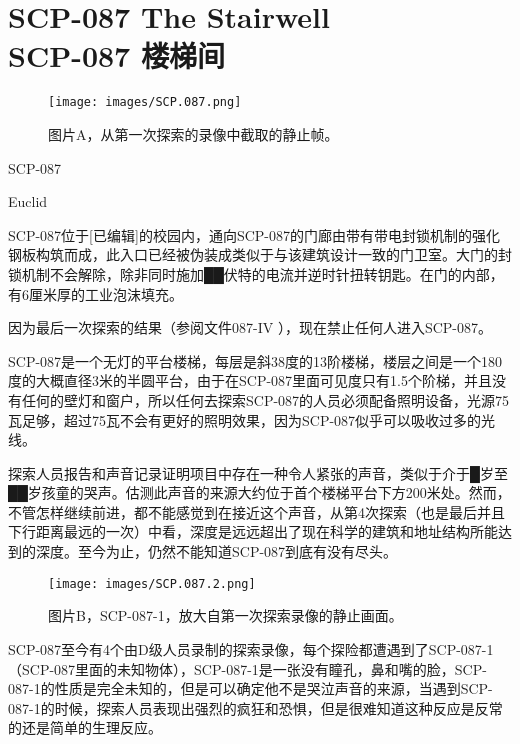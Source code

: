 \chapter[SCP-087 楼梯间]{
    SCP-087 The Stairwell\\
    SCP-087 楼梯间\\
    \heritage
}

\label{chap:SCP-087}

\begin{figure}[H]
    \centering
    \texttt{[image: images/SCP.087.png]}
    \caption*{图片A，从第一次探索的录像中截取的静止帧。}
\end{figure}

SCP-087

Euclid

SCP-087位于{[}已编辑]的校园内，通向SCP-087的门廊由带有带电封锁机制的强化钢板构筑而成，此入口已经被伪装成类似于与该建筑设计一致的门卫室。大门的封锁机制不会解除，除非同时施加██伏特的电流并逆时针扭转钥匙。在门的内部，有6厘米厚的工业泡沫填充。

因为最后一次探索的结果（参阅文件087-IV ），现在禁止任何人进入SCP-087。

 SCP-087是一个无灯的平台楼梯，每层是斜38度的13阶楼梯，楼层之间是一个180度的大概直径3米的半圆平台，由于在SCP-087里面可见度只有1.5个阶梯，并且没有任何的壁灯和窗户，所以任何去探索SCP-087的人员必须配备照明设备，光源75瓦足够，超过75瓦不会有更好的照明效果，因为SCP-087似乎可以吸收过多的光线。

探索人员报告和声音记录证明项目中存在一种令人紧张的声音，类似于介于█岁至██岁孩童的哭声。估测此声音的来源大约位于首个楼梯平台下方200米处。然而，不管怎样继续前进，都不能感觉到在接近这个声音，从第4次探索（也是最后并且下行距离最远的一次）中看，深度是远远超出了现在科学的建筑和地址结构所能达到的深度。至今为止，仍然不能知道SCP-087到底有没有尽头。

\begin{figure}[H]
    \centering
    \texttt{[image: images/SCP.087.2.png]}
    \caption*{图片B，SCP-087-1，放大自第一次探索录像的静止画面。}
\end{figure}

SCP-087至今有4个由D级人员录制的探索录像，每个探险都遭遇到了SCP-087-1（SCP-087里面的未知物体），SCP-087-1是一张没有瞳孔，鼻和嘴的脸，SCP-087-1的性质是完全未知的，但是可以确定他不是哭泣声音的来源，当遇到SCP-087-1的时候，探索人员表现出强烈的疯狂和恐惧，但是很难知道这种反应是反常的还是简单的生理反应。

